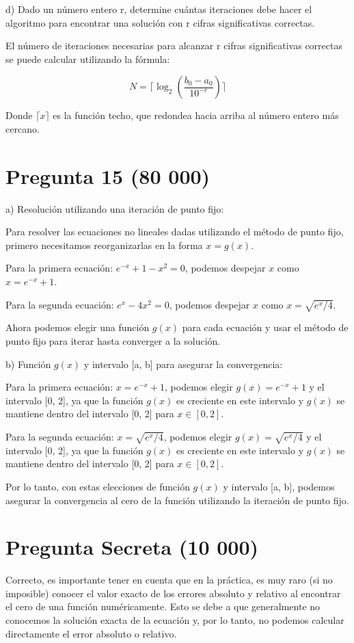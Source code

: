 \documentclass[a4paper,12pt]{article}
\begin{document}
d) Dado un número entero r, determine cuántas iteraciones debe hacer el algoritmo para encontrar una solución con r cifras significativas correctas.

El número de iteraciones necesarias para alcanzar r cifras significativas correctas se puede calcular utilizando la fórmula:

\[ N= \lceil \log_2(\frac{b_0 - a_0}{10^{-r}}) \rceil \]

Donde \( \lceil x \rceil \) es la función techo, que redondea hacia arriba al número entero más cercano.


\section*{Pregunta 15 (80 000)}
a) Resolución utilizando una iteración de punto fijo:

Para resolver las ecuaciones no lineales dadas utilizando el método de punto fijo, primero necesitamos reorganizarlas en la forma \(x = g(x)\).

Para la primera ecuación: \(e^{-x} + 1 - x^2 = 0\), podemos despejar \(x\) como \(x = e^{-x} + 1\).

Para la segunda ecuación: \(e^x - 4x^2 = 0\), podemos despejar \(x\) como \(x = \sqrt{e^x/4}\).

Ahora podemos elegir una función \(g(x)\) para cada ecuación y usar el método de punto fijo para iterar hasta converger a la solución.

b) Función \(g(x)\) y intervalo [a, b] para asegurar la convergencia:

Para la primera ecuación: \(x = e^{-x} + 1\), podemos elegir \(g(x) = e^{-x} + 1\) y el intervalo [0, 2], ya que la función \(g(x)\) es creciente en este intervalo y \(g(x)\) se mantiene dentro del intervalo [0, 2] para \(x \in [0, 2]\).

Para la segunda ecuación: \(x = \sqrt{e^x/4}\), podemos elegir \(g(x) = \sqrt{e^x/4}\) y el intervalo [0, 2], ya que la función \(g(x)\) es creciente en este intervalo y \(g(x)\) se mantiene dentro del intervalo [0, 2] para \(x \in [0, 2]\).

Por lo tanto, con estas elecciones de función \(g(x)\) y intervalo [a, b], podemos asegurar la convergencia al cero de la función utilizando la iteración de punto fijo.


\section*{Pregunta Secreta (10 000)}
Correcto, es importante tener en cuenta que en la práctica, es muy raro (si no imposible) conocer el valor exacto de los errores absoluto y relativo al encontrar el cero de una función numéricamente. Esto se debe a que generalmente no conocemos la solución exacta de la ecuación y, por lo tanto, no podemos calcular directamente el error absoluto o relativo.
\end{document}
